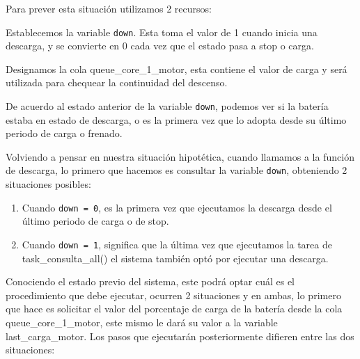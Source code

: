 \begin{itemize} [label = ·]
                        Para prever esta situación utilizamos 2 recursos:\par
                        Establecemos la variable \texttt{down}. Esta toma el valor de 1 cuando inicia una descarga, y se convierte en 0 cada vez que el estado pasa a stop o carga.\par
                        Designamos la cola queue\_core\_1\_motor, esta contiene el valor de carga y será utilizada para chequear la continuidad del descenso.\par
                        De acuerdo al estado anterior de la variable \texttt{down}, podemos ver si la batería estaba en estado de descarga, o es la primera vez que lo adopta desde su último periodo de carga o frenado.\par
                        Volviendo a pensar en nuestra situación hipotética, cuando llamamos a la función de descarga, lo primero que hacemos es consultar la variable \texttt{down}, obteniendo 2 situaciones posibles:\par
                        
                        \begin{enumerate}
                        \setlength{\itemindent}{1.5em}
                            \item Cuando \texttt{down = 0}, es la primera vez que ejecutamos la descarga desde el último periodo de carga o de stop.\par
                            \item Cuando \texttt{down = 1}, significa que la última vez que ejecutamos la tarea de task\_consulta\_all() el sistema también optó por ejecutar una descarga.\par
                        \end{enumerate}
                        
                        Conociendo el estado previo del sistema, este podrá optar cuál es el procedimiento que debe ejecutar, ocurren 2 situaciones y en ambas, lo primero que hace es solicitar el valor del porcentaje de carga de la batería desde la cola queue\_core\_1\_motor, este mismo le dará su valor a la variable last\_carga\_motor. Los pasos que ejecutarán posteriormente difieren entre las dos situaciones:\par


\end{itemize}
